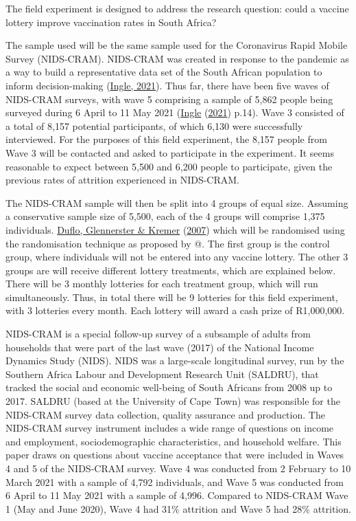 \documentclass[11pt,preprint, authoryear]{elsarticle}
\numberwithin{equation}{section}
\numberwithin{figure}{section}
\numberwithin{table}{section}
\begin{document}
The field experiment is designed to address the research question: could
a vaccine lottery improve vaccination rates in South Africa?

The sample used will be the same sample used for the Coronavirus Rapid
Mobile Survey (NIDS-CRAM). NIDS-CRAM was created in response to the
pandemic as a way to build a representative data set of the South
African population to inform decision-making
(\protect\hyperlink{ref-nids}{Ingle, 2021}). Thus far, there have been
five waves of NIDS-CRAM surveys, with wave 5 comprising a sample of
5,862 people being surveyed during 6 April to 11 May 2021
(\protect\hyperlink{ref-nids}{Ingle}
(\protect\hyperlink{ref-nids}{2021}) p.14). Wave 3 consisted of a total
of 8,157 potential participants, of which 6,130 were successfully
interviewed. For the purposes of this field experiment, the 8,157 people
from Wave 3 will be contacted and asked to participate in the
experiment. It seems reasonable to expect between 5,500 and 6,200 people
to participate, given the previous rates of attrition experienced in
NIDS-CRAM.

The NIDS-CRAM sample will then be split into 4 groups of equal size.
Assuming a conservative sample size of 5,500, each of the 4 groups will
comprise 1,375 individuals. \protect\hyperlink{ref-random}{Duflo,
Glennerster \& Kremer} (\protect\hyperlink{ref-random}{2007}) which will
be randomised using the randomisation technique as proposed by @. The
first group is the control group, where individuals will not be entered
into any vaccine lottery. The other 3 groups are will receive different
lottery treatments, which are explained below. There will be 3 monthly
lotteries for each treatment group, which will run simultaneously. Thus,
in total there will be 9 lotteries for this field experiment, with 3
lotteries every month. Each lottery will award a cash prize of
R1,000,000.

NIDS-CRAM is a special follow-up survey of a subsample of adults from
households that were part of the last wave (2017) of the National Income
Dynamics Study (NIDS). NIDS was a large-scale longitudinal survey, run
by the Southern Africa Labour and Development Research Unit (SALDRU),
that tracked the social and economic well-being of South Africans from
2008 up to 2017. SALDRU (based at the University of Cape Town) was
responsible for the NIDS-CRAM survey data collection, quality assurance
and production. The NIDS-CRAM survey instrument includes a wide range of
questions on income and employment, sociodemographic characteristics,
and household welfare. This paper draws on questions about vaccine
acceptance that were included in Waves 4 and 5 of the NIDS-CRAM survey.
Wave 4 was conducted from 2 February to 10 March 2021 with a sample of
4,792 individuals, and Wave 5 was conducted from 6 April to 11 May 2021
with a sample of 4,996. Compared to NIDS-CRAM Wave 1 (May and June
2020), Wave 4 had 31\% attrition and Wave 5 had 28\% attrition.
\end{document}
